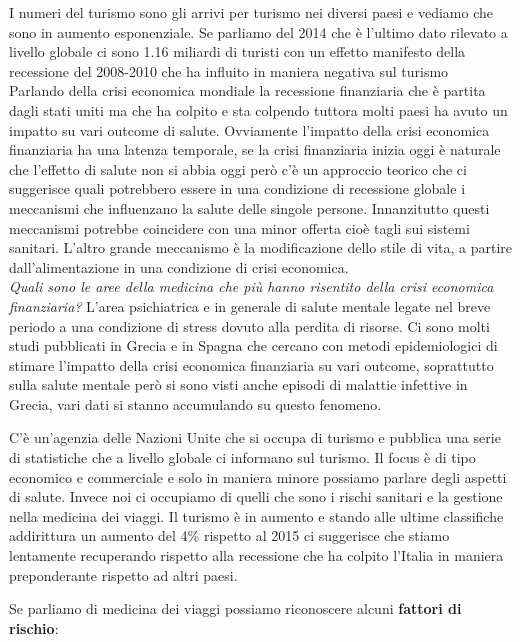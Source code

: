 I numeri del turismo sono gli arrivi per turismo nei diversi paesi e
vediamo che sono in aumento esponenziale. Se parliamo del 2014 che è
l'ultimo dato rilevato a livello globale ci sono 1.16 miliardi di
turisti con un effetto manifesto della recessione del 2008-2010 che ha
influito in maniera negativa sul turismo\\
Parlando della crisi economica mondiale la recessione finanziaria che è
partita dagli stati uniti ma che ha colpito e sta colpendo tuttora molti
paesi ha avuto un impatto su vari outcome di salute. Ovviamente
l'impatto della crisi economica finanziaria ha una latenza temporale, se
la crisi finanziaria inizia oggi è naturale che l'effetto di salute non
si abbia oggi però c'è un approccio teorico che ci suggerisce quali
potrebbero essere in una condizione di recessione globale i meccanismi
che influenzano la salute delle singole persone. Innanzitutto questi
meccanismi potrebbe coincidere con una minor offerta cioè tagli sui
sistemi sanitari. L'altro grande meccanismo è la modificazione dello
stile di vita, a partire dall'alimentazione in una condizione di crisi
economica.\\
\emph{Quali sono le aree della medicina che più hanno risentito della
crisi economica finanziaria?} L'area psichiatrica e in generale di
salute mentale legate nel breve periodo a una condizione di stress
dovuto alla perdita di risorse. Ci sono molti studi pubblicati in Grecia
e in Spagna che cercano con metodi epidemiologici di stimare l'impatto
della crisi economica finanziaria su vari outcome, soprattutto sulla
salute mentale però si sono visti anche episodi di malattie infettive in
Grecia, vari dati si stanno accumulando su questo fenomeno.

C'è un'agenzia delle Nazioni Unite che si occupa di turismo e pubblica
una serie di statistiche che a livello globale ci informano sul turismo.
Il focus è di tipo economico e commerciale e solo in maniera minore
possiamo parlare degli aspetti di salute. Invece noi ci occupiamo di
quelli che sono i rischi sanitari e la gestione nella medicina dei
viaggi. Il turismo è in aumento e stando alle ultime classifiche
addirittura un aumento del 4\% rispetto al 2015 ci suggerisce che stiamo
lentamente recuperando rispetto alla recessione che ha colpito l'Italia
in maniera preponderante rispetto ad altri paesi.

Se parliamo di medicina dei viaggi possiamo riconoscere alcuni
\textbf{fattori di rischio}:\\

